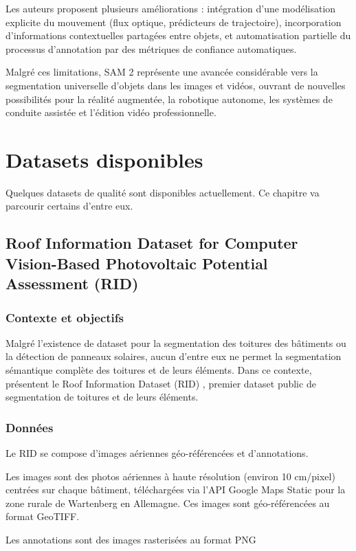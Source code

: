 Les auteurs proposent plusieurs améliorations : intégration d'une modélisation explicite du mouvement (flux optique, prédicteurs de trajectoire), incorporation d'informations contextuelles partagées entre objets, et automatisation partielle du processus d'annotation par des métriques de confiance automatiques.

Malgré ces limitations, SAM 2 représente une avancée considérable vers la segmentation universelle d'objets dans les images et vidéos, ouvrant de nouvelles possibilités pour la réalité augmentée, la robotique autonome, les systèmes de conduite assistée et l'édition vidéo professionnelle.
\section{Datasets disponibles}
\label{sec:dataset_disponible}
\par{Quelques datasets de qualité sont disponibles actuellement. Ce chapitre va parcourir certains d'entre eux.}


\subsection{Roof Information Dataset for Computer Vision-Based Photovoltaic Potential Assessment (RID)}
\label{subsec:rid_roof_information_dataset}

\subsubsection{Contexte et objectifs}
\par{Malgré l'existence de dataset pour la segmentation des toitures des bâtiments ou la détection de panneaux solaires, aucun d'entre eux ne permet la segmentation sémantique complète des toitures et de leurs éléments. Dans ce contexte, \citeauthor{krapf_ridroof_2022} présentent le Roof Information Dataset (RID) \cite{krapf_ridroof_2022}, premier dataset public de segmentation de toitures et de leurs éléments.}

\subsubsection{Données}
\par{Le RID se compose d'images aériennes géo-référencées et d'annotations.}
\par{Les images sont des photos aériennes à haute résolution (environ 10 \si{\unit{cm/pixel}}) centrées sur chaque bâtiment, téléchargées via l'API Google Maps Static pour la zone rurale de Wartenberg en Allemagne. Ces images sont géo-référencées au format GeoTIFF.}
\par{Les annotations sont des images rasterisées au format PNG}


